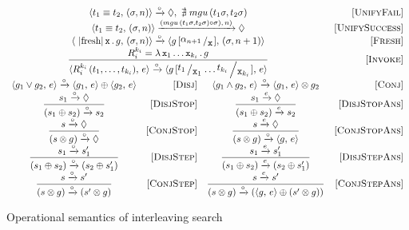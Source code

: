 \begin{figure*}[h]
  \renewcommand{\arraystretch}{1.6}
  \[
  \begin{array}{crcr}
    \multicolumn{3}{c}{\taskst{t_1 \equiv t_2}{(\sigma, n)} \xrightarrow{\circ} \Diamond , \, \, \nexists\; mgu\,(t_1 \sigma, t_2 \sigma)} &\ruleno{UnifyFail} \\
    \multicolumn{3}{c}{\taskst{t_1 \equiv t_2}{(\sigma, n)} \xrightarrow{(mgu\,(t_1 \sigma, t_2 \sigma) \circ \sigma),\, n)} \Diamond} & \ruleno{UnifySuccess} \\
    \multicolumn{3}{c}{\taskst{\mbox{\lstinline|fresh|}\, \ttt{x}\, .\, g}{(\sigma, n)} \xrightarrow{\circ} \taskst{g\,[\bigslant{\alpha_{n + 1}}{\ttt{x}}]}{( \sigma, n + 1)}} & \ruleno{Fresh} \\
    \multicolumn{3}{c}{\dfrac{R_i^{k_i}=\lambda\,\ttt{x}_1\dots \ttt{x}_{k_i}\,.\,g}{\taskst{R_i^{k_i}\,(t_1,\dots,t_{k_i})}{e} \xrightarrow{\circ} \taskst{g\,[\bigslant{t_1}{\ttt{x}_1}\dots\bigslant{t_{k_i}}{\ttt{x}_{k_i}}]}{e}}} & \ruleno{Invoke}\\[3mm]
    \taskst{g_1 \lor g_2}{e} \xrightarrow{\circ} \taskst{g_1}{e} \oplus \taskst{g_2}{e} & \ruleno{Disj} &
    \taskst{g_1 \land g_2}{e} \xrightarrow{\circ} \taskst{g_1}{e} \otimes g_2 & \ruleno{Conj} \\    
    \dfrac{s_1 \xrightarrow{\circ} \Diamond}{(s_1 \oplus s_2) \xrightarrow{\circ} s_2} & \ruleno{DisjStop} &
    \dfrac{s_1 \xrightarrow{e} \Diamond}{(s_1 \oplus s_2) \xrightarrow{e} s_2} & \ruleno{DisjStopAns}\\
    \dfrac{s \xrightarrow{\circ} \Diamond}{(s \otimes g) \xrightarrow{\circ} \Diamond} &\ruleno{ConjStop} &
    \dfrac{s \xrightarrow{e} \Diamond}{(s \otimes g) \xrightarrow{\circ} \taskst{g}{e}}  & \ruleno{ConjStopAns}\\
    \dfrac{s_1 \xrightarrow{\circ} s'_1}{(s_1 \oplus s_2) \xrightarrow{\circ} (s_2 \oplus s'_1)} &\ruleno{DisjStep} &
    \dfrac{s_1 \xrightarrow{e} s'_1}{(s_1 \oplus s_2) \xrightarrow{e} (s_2 \oplus s'_1)} &\ruleno{DisjStepAns}\\
    \dfrac{s \xrightarrow{\circ} s'}{(s \otimes g) \xrightarrow{\circ} (s' \otimes g)} &\ruleno{ConjStep} &
    \dfrac{s \xrightarrow{e} s'}{(s \otimes g) \xrightarrow{\circ} (\taskst{g}{e} \oplus (s' \otimes g))} & \ruleno{ConjStepAns} 
  \end{array}
  \]
  \caption{Operational semantics of interleaving search}
  \label{fig:operanional_semantics_rules}
\end{figure*}

